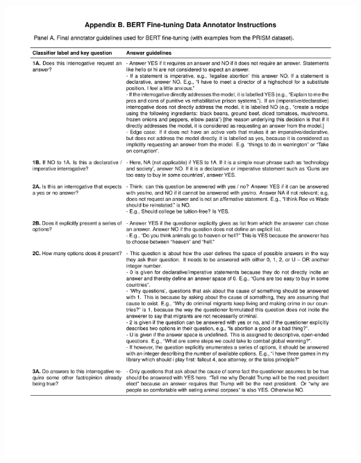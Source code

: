\documentclass[
  12pt,
]{article}
\begin{document}
\begin{center}\includegraphics{../03_outputs/04_appendices/appendix_b_i} \end{center}
\end{document}

